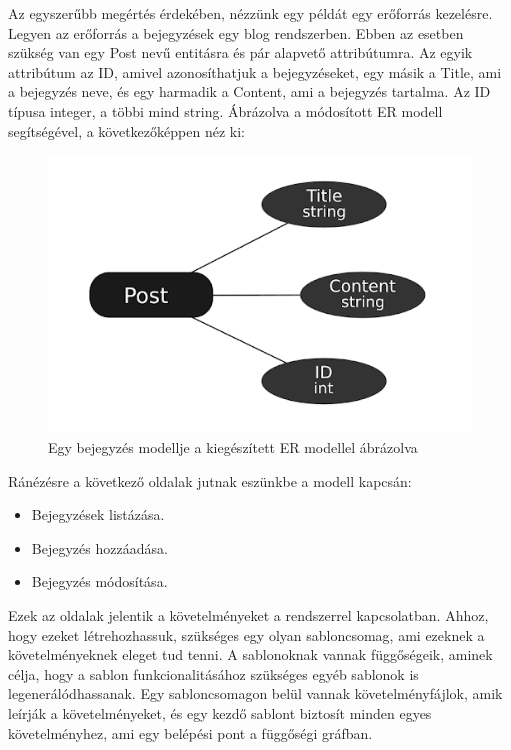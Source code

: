 \documentclass[a4paper,12pt,oneside]{report}
\begin{document}
\begin{justify}

	Az egyszerűbb megértés érdekében, nézzünk egy példát egy erőforrás kezelésre. Legyen az erőforrás a bejegyzések egy blog rendszerben. Ebben az esetben szükség van egy Post nevű entitásra és pár alapvető attribútumra. Az egyik attribútum az ID, amivel azonosíthatjuk a bejegyzéseket, egy másik a Title, ami a bejegyzés neve, és egy harmadik a Content, ami a bejegyzés tartalma. Az ID típusa integer, a többi mind string. Ábrázolva a módosított ER modell segítségével, a következőképpen néz ki:

	\begin{figure}[h]
		\includegraphics[width=\textwidth]{contents/images/post_ermodel.png}
		\caption{Egy bejegyzés modellje a kiegészített ER modellel ábrázolva}
		\label{fig:post_ermodel}
	\end{figure}

	Ránézésre a következő oldalak jutnak eszünkbe a modell kapcsán:

    \begin{itemize}
        \item Bejegyzések listázása.
        \item Bejegyzés hozzáadása.
        \item Bejegyzés módosítása.
    \end{itemize}

	Ezek az oldalak jelentik a követelményeket a rendszerrel kapcsolatban. Ahhoz, hogy ezeket létrehozhassuk, szükséges egy olyan sabloncsomag, ami ezeknek a követelményeknek eleget tud tenni. A sablonoknak vannak függőségeik, aminek célja, hogy a sablon funkcionalitásához szükséges egyéb sablonok is legenerálódhassanak.  Egy sabloncsomagon belül vannak követelményfájlok, amik leírják a követelményeket, és egy kezdő sablont biztosít minden egyes követelményhez, ami egy belépési pont a függőségi gráfban.


\end{justify}
\end{document}

